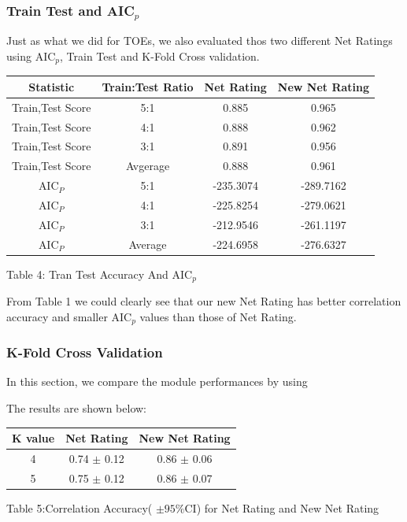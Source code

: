 \documentclass[11pt]{article}
\begin{document}
\subsubsection*{Train Test and AIC$_p$}
Just as what we did for TOEs, we also evaluated thos two different Net Ratings using 
AIC$_p$, Train Test and K-Fold Cross validation.
\begin{center}
\begin{tabular}{|c|c|c|c|}
\hline
Statistic&Train:Test Ratio& Net Rating & New Net Rating\\
\hline
Train,Test Score & 5:1 & 0.885 & 0.965 \\
Train,Test Score & 4:1 & 0.888 & 0.962\\ 
Train,Test Score & 3:1 & 0.891 & 0.956 \\ 
\hline
Train,Test Score & Avgerage& 0.888 & 0.961\\
\hline 
AIC$_P$& 5:1 & -235.3074 & -289.7162\\
AIC$_P$& 4:1 & -225.8254 & -279.0621\\
AIC$_P$& 3:1 & -212.9546 & -261.1197 \\
\hline
AIC$_P$& Average & -224.6958 & -276.6327\\
\hline
\end{tabular}

\bigskip
Table 4: Tran Test Accuracy And AIC$_p$
\end{center}
From Table 1 we could clearly see that our new Net Rating has better correlation accuracy and smaller AIC$_p$ values than those of Net Rating.

\subsubsection*{K-Fold Cross Validation}
In this section, we compare the module performances by using 

The results are shown below:

\begin{center}
\begin{tabular}{|c|c|c|}
\hline
 K value & Net Rating & New Net Rating \\
\hline
 4 & 0.74 $\pm$ 0.12 & 0.86 $\pm$ 0.06\\
 5 & 0.75 $\pm$ 0.12 & 0.86 $\pm$ 0.07 \\
\hline
\end{tabular}
\bigskip

Table 5:Correlation Accuracy( $\pm 95\%$CI) for Net Rating and New Net Rating
\end{center}
\end{document}
